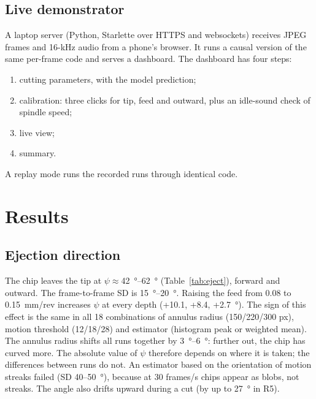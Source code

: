 \documentclass[conference,a4paper]{IEEEtran}
\begin{document}
\subsection{Live demonstrator}
A laptop server (Python, Starlette over HTTPS and websockets) receives JPEG frames and 16-kHz audio from a phone's browser.
It runs a causal version of the same per-frame code and serves a dashboard.
The dashboard has four steps:
\begin{enumerate}
\item cutting parameters, with the model prediction;
\item calibration: three clicks for tip, feed and outward, plus an idle-sound check of spindle speed;
\item live view;
\item summary.
\end{enumerate}
A replay mode runs the recorded runs through identical code.

\section{Results}
\subsection{Ejection direction}
The chip leaves the tip at $\psi\approx$\SIrange{42}{62}{\degree} (Table~\ref{tab:eject}), forward and outward.
The frame-to-frame SD is \SIrange{15}{20}{\degree}.
Raising the feed from 0.08 to \SI{0.15}{mm/rev} increases $\psi$ at every depth (+10.1, +8.4, +\SI{2.7}{\degree}).
The sign of this effect is the same in all 18 combinations of annulus radius (150/220/300 px), motion threshold (12/18/28) and estimator (histogram peak or weighted mean).
The annulus radius shifts all runs together by \SIrange{3}{6}{\degree}: further out, the chip has curved more.
The absolute value of $\psi$ therefore depends on where it is taken; the differences between runs do not.
An estimator based on the orientation of motion streaks failed (SD 40--\SI{50}{\degree}), because at 30 frames/s chips appear as blobs, not streaks.
The angle also drifts upward during a cut (by up to \SI{27}{\degree} in R5).
\end{document}
